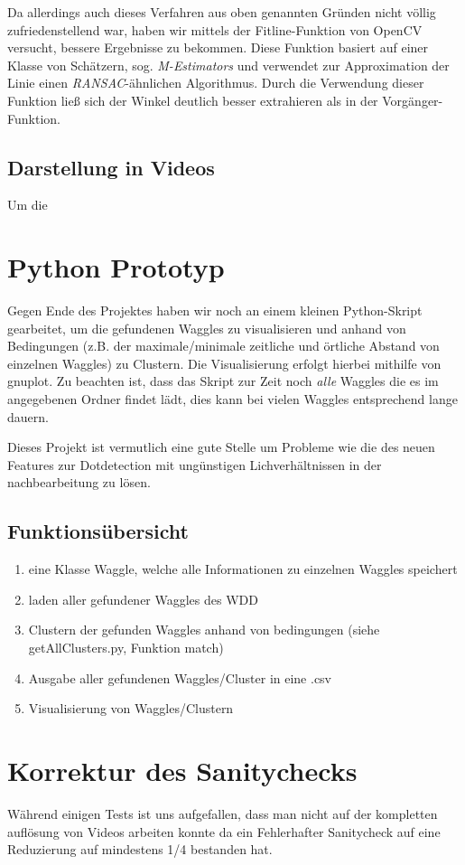 \documentclass[11pt,a4paper]{article}
\begin{document}
Da allerdings auch dieses Verfahren aus oben genannten Gründen nicht völlig zufriedenstellend war, haben wir mittels der Fitline-Funktion von OpenCV versucht, bessere Ergebnisse zu bekommen.
Diese Funktion basiert auf einer Klasse von Schätzern, sog. \textit{M-Estimators} und verwendet zur Approximation der Linie einen \textit{RANSAC}-ähnlichen Algorithmus.
Durch die Verwendung dieser Funktion ließ sich der Winkel deutlich besser extrahieren als in der Vorgänger-Funktion.

\subsection{Darstellung in Videos}%

Um die 

\section{Python Prototyp}%
Gegen Ende des Projektes haben wir noch an einem kleinen Python-Skript gearbeitet, um die gefundenen Waggles zu visualisieren und anhand von Bedingungen (z.B. der maximale/minimale zeitliche und örtliche Abstand von einzelnen Waggles) zu Clustern. Die Visualisierung erfolgt hierbei mithilfe von gnuplot. Zu beachten ist, dass das Skript zur Zeit noch \emph{alle} Waggles die es im angegebenen Ordner findet lädt, dies kann bei vielen Waggles entsprechend lange dauern.

Dieses Projekt ist vermutlich eine gute Stelle um Probleme wie die des neuen Features zur Dotdetection mit ungünstigen Lichverhältnissen in der nachbearbeitung zu lösen.
\subsection{Funktionsübersicht}%
\begin{enumerate}
\item eine Klasse Waggle, welche alle Informationen zu einzelnen Waggles speichert
\item laden aller gefundener Waggles des WDD
\item Clustern der gefunden Waggles anhand von bedingungen (siehe getAllClusters.py, Funktion match)
\item Ausgabe aller gefundenen Waggles/Cluster in eine .csv
\item Visualisierung von Waggles/Clustern\\
\end{enumerate}

\section{Korrektur des Sanitychecks}
Während einigen Tests ist uns aufgefallen, dass man nicht auf der kompletten auflösung von Videos arbeiten konnte da ein Fehlerhafter Sanitycheck auf eine Reduzierung auf mindestens 1/4 bestanden hat.
\end{document}

